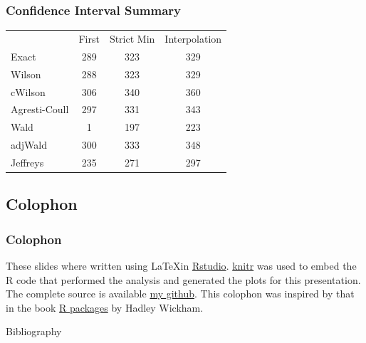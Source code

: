 \documentclass{beamer}\usepackage{knitr}
\begin{document}
\begin{frame}[fragile]
\frametitle{Confidence Interval Summary}
\begin{center}
  \begin{tabular}{lccc}
              & First & Strict Min & Interpolation \\
    Exact     & 289 & 323 & 329 \\
    Wilson    & 288 & 323 & 329 \\
    cWilson   & 306 & 340 & 360 \\
    Agresti-Coull   & 297 & 331 & 343 \\
    Wald      & 1 & 197 & 223 \\
    adjWald   & 300 & 333 & 348 \\
    Jeffreys  & 235 & 271 & 297 \\
  \end{tabular}
\end{center}
\end{frame}

\subsection{Colophon}

\begin{frame}
\frametitle{Colophon}

These slides where written using \LaTeX in \href{http://www.rstudio.com/ide/}{Rstudio}. \href{http://yihui.name/knitr/}{knitr} was used to embed the R code that performed the analysis and generated the plots for this presentation. The complete source is available \href{https://github.com/Armadilloa16/LBT\_interview\_presentation}{my github}. This colophon was inspired by that in the book \href{http://r-pkgs.had.co.nz/intro.html\#intro-colophon}{R packages} by Hadley Wickham.

\end{frame}



\begin{frame}{Bibliography}


\end{frame}
\end{document}
